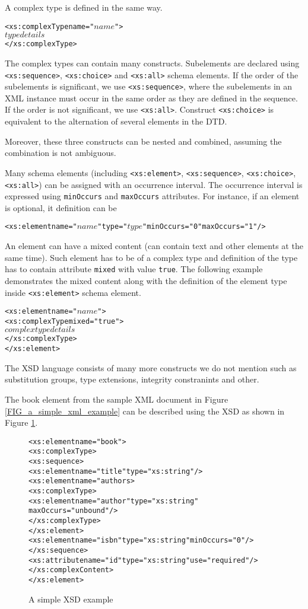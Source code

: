 A complex type is defined in the same way.
\begin{alltt}
<xs:complexType name="\(name\)">
  \(type details\)
</xs:complexType>
\end{alltt}
The complex types can contain many constructs. Subelements are declared using \texttt{<xs:sequence>}, \texttt{<xs:choice>} and \texttt{<xs:all>} schema elements. If the order of the subelements is significant, we use \texttt{<xs:sequence>}, where the subelements in an XML instance must occur in the same order as they are defined in the sequence. If the order is not significant, we use \texttt{<xs:all>}. Construct \texttt{<xs:choice>} is equivalent to the alternation of several elements in the DTD.

Moreover, these three constructs can be nested and combined, assuming the combination is not ambiguous.

Many schema elements (including \texttt{<xs:element>}, \texttt{<xs:sequence>}, \texttt{<xs:choice>}, \texttt{<xs:all>}) can be assigned with an occurrence interval. The occurrence interval is expressed using \texttt{minOccurs} and \texttt{maxOccurs} attributes. For instance, if an element is optional, it definition can be
\begin{alltt}
<xs:element name="\(name\)" type="\(type\)" minOccurs="0" maxOccurs="1"/>
\end{alltt}

An element can have a mixed content (can contain text and other elements at the same time). Such element has to be of a complex type and definition of the type has to contain attribute \texttt{mixed} with value \texttt{true}. The following example demonstrates the mixed content along with the definition of the element type inside \texttt{<xs:element>} schema element.
\begin{alltt}
<xs:element name="\(name\)">
  <xs:complexType mixed="true">
    \(complex type details\)
  </xs:complexType>
</xs:element>
\end{alltt}

The XSD language consists of many more constructs we do not mention such as substitution groups, type extensions, integrity constranints and other.

The book element from the sample XML document in Figure \ref{FIG_a_simple_xml_example} can be described using the XSD as shown in Figure \ref{FIG_a_simple_xsd_example}.

\begin{figure}
\begin{alltt}
<xs:element name="book">
  <xs:complexType>
    <xs:sequence>
      <xs:element name="title" type="xs:string"/>
      <xs:element name="authors>
        <xs:complexType>
          <xs:element name="author" type="xs:string"
           maxOccurs="unbound"/>
        </xs:complexType>
      </xs:element>
      <xs:element name="isbn" type="xs:string" minOccurs="0"/>
    </xs:sequence>
    <xs:attribute name="id" type="xs:string" use="required"/>
  </xs:complexContent>
</xs:element>
\end{alltt}
\caption{A simple XSD example}
\label{FIG_a_simple_xsd_example}
\end{figure}

